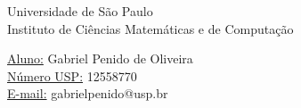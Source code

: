 \begin{titlepage}
    \begin{center}
        \huge{Universidade de São Paulo}\\
        \vspace{20pt}
        \large{Instituto de Ciências Matemáticas e de Computação}\\
        \vspace{70pt}
    \end{center}
    \vspace{70pt}
    \begin{flushright}
        \underline{Aluno:} Gabriel Penido de Oliveira \\
        \underline{Número USP:} 12558770 \\
        \underline{E-mail:} gabrielpenido@usp.br \\
    \end{flushright}
    \vfill
    \begin{center}
        \mydate
    \end{center}
\end{titlepage}